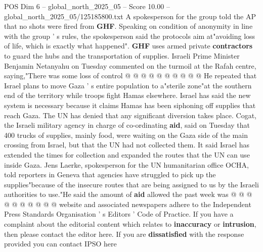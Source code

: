 \begin{textsample}{POS Dim 6 – global\_north\_2025\_05 – Score 10.00 – global\_north\_2025\_05/125185800.txt}
A spokesperson for the group told the AP that no shots were fired from \textbf{GHF}.
Speaking on condition of anonymity in line with the group ' s rules, the spokesperson said the protocols aim at"avoiding loss of life, which is exactly what happened". \textbf{GHF} uses armed private \textbf{contractors} to guard the hubs and the transportation of supplies.
Israeli Prime Minister Benjamin Netanyahu on Tuesday commented on the turmoil at the Rafah centre, saying,"There was some loss of control @ @ @ @ @ @ @ @ @ @ He repeated that Israel plans to move Gaza ' s entire population to a"sterile zone"at the southern end of the territory while troops fight Hamas elsewhere.
Israel has said the new system is necessary because it claims Hamas has been siphoning off supplies that reach Gaza.
The UN has denied that any significant diversion takes place.
Cogat, the Israeli military agency in charge of co-ordinating \textbf{aid}, said on Tuesday that 400 trucks of supplies, mainly food, were waiting on the Gaza side of the main crossing from Israel, but that the UN had not collected them.
It said Israel has extended the times for collection and expanded the routes that the UN can use inside Gaza.
Jens Laerke, spokesperson for the UN humanitarian office OCHA, told reporters in Geneva that agencies have struggled to pick up the supplies"because of the insecure routes that are being assigned to us by the Israeli authorities to use."He said the amount of \textbf{aid} allowed the past week was @ @ @ @ @ @ @ @ @ @ website and associated newspapers adhere to the Independent Press Standards Organisation ' s Editors ' Code of Practice.
If you have a complaint about the editorial content which relates to \textbf{inaccuracy} or \textbf{intrusion}, then please contact the editor here.
If you are \textbf{dissatisfied} with the response provided you can contact IPSO here

\end{textsample}
